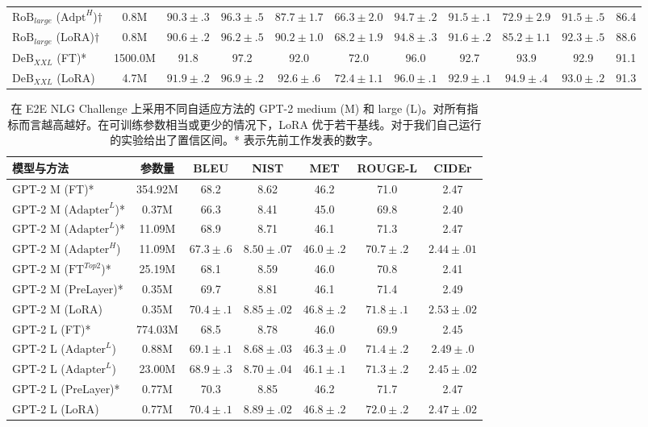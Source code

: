 \documentclass[11pt,UTF8,fontset=fandol]{ctexart}
\begin{document}
\begin{table}[H]
\begin{tabular}{lcccccccccc}
$\text{RoB}_{large}$ ($\text{Adpt}^H$)$\dagger$ & 0.8M & $90.3\pm.3$ & $96.3\pm.5$ & $87.7\pm1.7$ & $66.3\pm2.0$ & $94.7\pm.2$ & $91.5\pm.1$ & $72.9\pm2.9$ & $91.5\pm.5$ & 86.4 \\
$\text{RoB}_{large}$ (LoRA)$\dagger$ & 0.8M & $90.6\pm.2$ & $96.2\pm.5$ & $90.2\pm1.0$ & $68.2\pm1.9$ & $94.8\pm.3$ & $91.6\pm.2$ & $85.2\pm1.1$ & $92.3\pm.5$ & 88.6 \\
\midrule
$\text{DeB}_{XXL}$ (FT)* & 1500.0M & 91.8 & 97.2 & 92.0 & 72.0 & 96.0 & 92.7 & 93.9 & 92.9 & 91.1 \\
$\text{DeB}_{XXL}$ (LoRA) & 4.7M & $91.9\pm.2$ & $96.9\pm.2$ & $92.6\pm.6$ & $72.4\pm1.1$ & $96.0\pm.1$ & $92.9\pm.1$ & $94.9\pm.4$ & $93.0\pm.2$ & 91.3 \\
\bottomrule
\end{tabular}
\end{table}

\begin{table}[H]\centering
\caption{在 E2E NLG Challenge 上采用不同自适应方法的 GPT-2 medium (M) 和 large (L)。对所有指标而言越高越好。在可训练参数相当或更少的情况下，LoRA 优于若干基线。对于我们自己运行的实验给出了置信区间。* 表示先前工作发表的数字。}
\label{tab:3}
\begin{tabular}{lcccccc}
\toprule
模型与方法 & 参数量 & BLEU & NIST & MET & ROUGE-L & CIDEr \\
\midrule
GPT-2 M (FT)* & 354.92M & 68.2 & 8.62 & 46.2 & 71.0 & 2.47 \\
GPT-2 M ($\text{Adapter}^L$)* & 0.37M & 66.3 & 8.41 & 45.0 & 69.8 & 2.40 \\
GPT-2 M ($\text{Adapter}^L$)* & 11.09M & 68.9 & 8.71 & 46.1 & 71.3 & 2.47 \\
GPT-2 M ($\text{Adapter}^H$) & 11.09M & $67.3\pm.6$ & $8.50\pm.07$ & $46.0\pm.2$ & $70.7\pm.2$ & $2.44\pm.01$ \\
GPT-2 M ($\text{FT}^{Top2}$)* & 25.19M & 68.1 & 8.59 & 46.0 & 70.8 & 2.41 \\
GPT-2 M (PreLayer)* & 0.35M & 69.7 & 8.81 & 46.1 & 71.4 & 2.49 \\
GPT-2 M (LoRA) & 0.35M & $70.4\pm.1$ & $8.85\pm.02$ & $46.8\pm.2$ & $71.8\pm.1$ & $2.53\pm.02$ \\
\midrule
GPT-2 L (FT)* & 774.03M & 68.5 & 8.78 & 46.0 & 69.9 & 2.45 \\
GPT-2 L ($\text{Adapter}^L$) & 0.88M & $69.1\pm.1$ & $8.68\pm.03$ & $46.3\pm.0$ & $71.4\pm.2$ & $2.49\pm.0$ \\
GPT-2 L ($\text{Adapter}^L$) & 23.00M & $68.9\pm.3$ & $8.70\pm.04$ & $46.1\pm.1$ & $71.3\pm.2$ & $2.45\pm.02$ \\
GPT-2 L (PreLayer)* & 0.77M & 70.3 & 8.85 & 46.2 & 71.7 & 2.47 \\
GPT-2 L (LoRA) & 0.77M & $70.4\pm.1$ & $8.89\pm.02$ & $46.8\pm.2$ & $72.0\pm.2$ & $2.47\pm.02$ \\
\bottomrule
\end{tabular}
\end{table}
\end{document}
